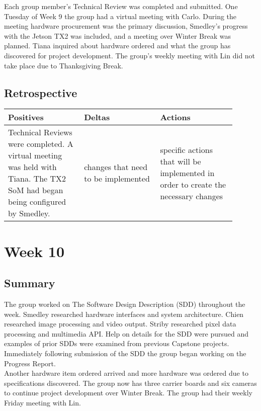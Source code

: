 \documentclass[letterpaper,10pt,serif,draftclsnofoot,onecolumn,compsoc,titlepage]{IEEEtran}
\begin{document}
Each group member's Technical Review was completed and submitted. One Tuesday of Week 
9 the group had a virtual meeting with Carlo. During the meeting hardware procurement 
was the primary discussion, Smedley's progress with the Jetson TX2 was included, and 
a meeting over Winter Break was planned. Tiana inquired about hardware ordered and 
what the group has discovered for project development. The group's weekly meeting with 
Lin did not take place due to Thanksgiving Break. \\

\subsection{Retrospective}

\begin{tabular}{|p{0.3\linewidth}|p{0.3\linewidth}|p{0.3\linewidth}|}
   \hline
   \textbf{Positives} & \textbf{Deltas} & \textbf{Actions}\\ 
   \hline
   Technical Reviews were completed. A virtual meeting was held with Tiana. The 
   TX2 SoM had began being configured by Smedley.  
   & 
   changes that need to be implemented 
   & 
   specific actions that will be implemented in order to create the necessary 
   changes \\
   \hline
\end{tabular}

\section{Week 10}

\subsection{Summary}

The group worked on The Software Design Description (SDD) throughout the week. Smedley 
researched hardware interfaces and system architecture. Chien researched image 
processing and video output. Striby researched pixel data processing and multimedia 
API. Help on details for the SDD were pursued and examples of prior SDDs were examined 
from previous Capstone projects. Immediately following submission of the SDD the 
group began working on the Progress Report. \\

Another hardware item ordered arrived and more hardware was ordered due to 
specifications discovered. The group now has three carrier boards and six cameras to 
continue project development over Winter Break. The group had their weekly Friday 
meeting with Lin.\\
\end{document}

